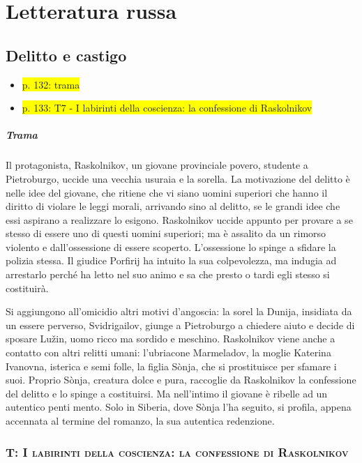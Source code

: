 \documentclass{book}
\newcommand{\pagine}[1]{\colorbox{yellow}{#1}}
\newcounter{mar}
\begin{document}
\chapter{Letteratura russa}

\section{Delitto e castigo}

\begin{itemize}
\item
  \pagine{p. 132: trama}
\item
  \pagine{p. 133: T7 - I labirinti della coscienza: la confessione di Raskolnikov}
\end{itemize}

\paragraph{Trama} Il protagonista, Raskolnikov, un giovane provinciale povero, studente a Pietroburgo, uccide una vecchia usuraia e la sorella. La motivazione del delitto è nelle idee del giovane, che ritiene che vi siano uomini superiori che hanno il diritto di violare le leggi morali, arrivando sino al delitto, se le grandi idee che essi aspirano a realizzare lo esigono. Raskolnikov uccide appunto per provare a se stesso di essere uno di questi uomini superiori; ma è assalito da un rimorso violento e dall'ossessione di essere scoperto. L'ossessione lo spinge a sfidare la polizia stessa. Il giudice Porfirij ha intuito la sua colpevolezza, ma indugia ad arrestarlo perché ha letto nel suo animo e sa che presto o tardi egli stesso si costituirà.

Si aggiungono all'omicidio altri motivi d'angoscia: la sorel la Dunija, insidiata da un essere perverso, Svidrigailov, giunge a Pietroburgo a chiedere aiuto e decide di sposare Lužin, uomo ricco ma sordido e meschino. Raskolnikov viene anche a contatto con altri relitti umani: l'ubriacone Marmeladov, la moglie Katerina Ivanovna, isterica e semi folle, la figlia Sònja, che si prostituisce per sfamare i suoi. Proprio Sònja, creatura dolce e pura, raccoglie da Raskolnikov la confessione del delitto e lo spinge a costituirsi. Ma nell'intimo il giovane è ribelle ad un autentico penti mento. Solo in Siberia, dove Sònja l'ha seguito, si profila, appena accennata al termine del romanzo, la sua autentica redenzione.

\subsection{T: \textsc{I labirinti della coscienza: la confessione di Raskolnikov}}
\end{document}
